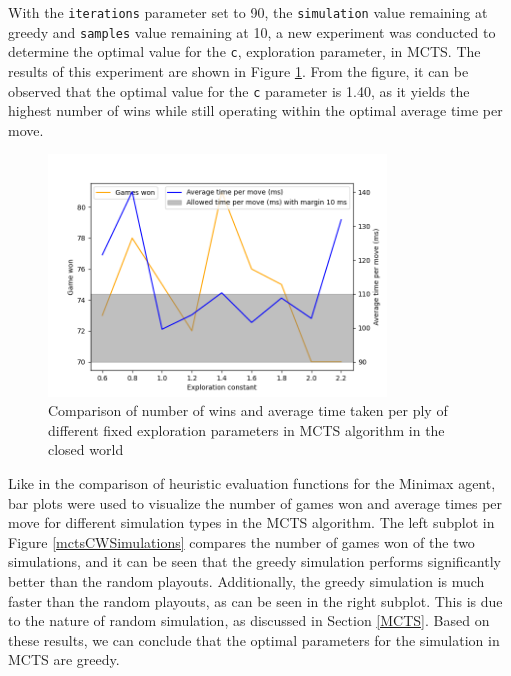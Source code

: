 With the \texttt{iterations} parameter set to 90, the \texttt{simulation} value remaining at greedy and \texttt{samples} value remaining at 10, a new experiment was conducted to determine the optimal value for the \texttt{c}, exploration parameter, in MCTS. The results of this experiment are shown in Figure \ref{mctsCWC}. From the figure, it can be observed that the optimal value for the \texttt{c} parameter is 1.40, as it yields the highest number of wins while still operating within the optimal average time per move.

\begin{figure}[h]
  \centering
  \captionsetup{justification=centering}
  \includegraphics[width=0.8\textwidth]{../img/mcts_c_closedworld.png}
  \caption{Comparison of number of wins and average time taken per ply of different fixed exploration parameters in MCTS algorithm in the closed world}
  \label{mctsCWC}
\end{figure}

Like in the comparison of heuristic evaluation functions for the Minimax agent, bar plots were used to visualize the number of games won and average times per move for different simulation types in the MCTS algorithm. The left subplot in Figure \ref{mctsCWSimulations} compares the number of games won of the two simulations, and it can be seen that the greedy simulation performs significantly better than the random playouts. Additionally, the greedy simulation is much faster than the random playouts, as can be seen in the right subplot. This is due to the nature of random simulation, as discussed in Section \ref{MCTS}. Based on these results, we can conclude that the optimal parameters for the simulation in MCTS are greedy.

